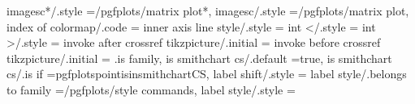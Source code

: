{{{{{{{{{{{{{{{{{{{imagesc*/.style                                                    ={/pgfplots/matrix plot*},%
imagesc/.style                                                     ={/pgfplots/matrix plot},%
index of colormap/.code                                            ={%
inner axis line style/.style                                       ={                                                                                                                                  
int </.style                                                       ={%
int >/.style                                                       ={%
invoke after crossref tikzpicture/.initial                         ={%
invoke before crossref tikzpicture/.initial                        ={%
.is family,
is smithchart cs/.default                                          =true,                                                                                                                              
is smithchart cs/.is if                                            =pgfplotspointisinsmithchartCS,                                                                                                     
label shift/.style                                                 ={%
label style/.belongs to family                                     =/pgfplots/style commands,                                                                                                          
label style/.style                                                 ={%
}}}}}}}}}}}}}}}}}}}}}}}}}}}
